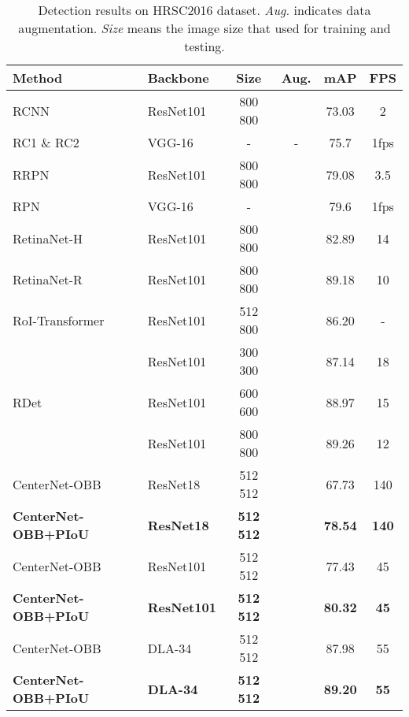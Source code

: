 \begin{table}[t!]
\footnotesize
\centering
\setlength{\tabcolsep}{5pt}
\caption{Detection results on HRSC2016 dataset. \emph{Aug.} indicates data augmentation. \emph{Size} means the image size that used for training and testing.}
\vspace{-2mm}
\begin{tabular}{llcccc}
\hline
Method                 & Backbone    & Size & Aug. & mAP &FPS  \\ \hline
RCNN~\cite{Jiang2017RRR}               & ResNet101   & 800  800    &          & 73.03 & 2\\
RC1 \& RC2~\cite{liu2017high} & VGG-16 & - & - & 75.7 & 1fps \\
RRPN~\cite{Ma2018AST}                   & ResNet101   & 800  800    &          & 79.08 & 3.5\\
RPN~\cite{zhang2018toward} & VGG-16 & - &  & 79.6 & 1fps \\
RetinaNet-H~\cite{Yang2019RRS}            & ResNet101   & 800  800    &          & 82.89 & 14\\
RetinaNet-R~\cite{Yang2019RRS}            & ResNet101   & 800  800    &          & 89.18 & 10\\
RoI-Transformer~\cite{Jian2019LRT}        & ResNet101   & 512  800    &          & 86.20 & - \\ \hline
\multirow{3}{*}{RDet~\cite{Yang2019RRS}}
        & ResNet101   & 300  300    &   & 87.14 & 18\\
        & ResNet101   & 600  600    &   & 88.97 & 15\\
        & ResNet101   & 800  800  &  & 89.26 & 12\\
        \hline \hline
CenterNet-OBB~\cite{Zhou2019OAP}       & ResNet18   & 512  512    &          & 67.73 & 140\\
\textbf{CenterNet-OBB+PIoU}   & \textbf{ResNet18}   & \textbf{512  512}    &          & \textbf{78.54} & \textbf{140}\\
CenterNet-OBB~\cite{Zhou2019OAP}       & ResNet101   & 512  512    &          & 77.43 & 45\\
\textbf{CenterNet-OBB+PIoU}   & \textbf{ResNet101}   & \textbf{512  512}    &          & \textbf{80.32} & \textbf{45}\\
CenterNet-OBB~\cite{Zhou2019OAP}       & DLA-34   & 512  512    &          & 87.98 & 55\\
\textbf{CenterNet-OBB+PIoU}             & \textbf{DLA-34}   & \textbf{512  512}    &          & \textbf{89.20} & \textbf{55}\\ \hline
\end{tabular}
\vspace{-1mm}
\label{tab:state-of-the-art:hrsc2016}
\end{table}


